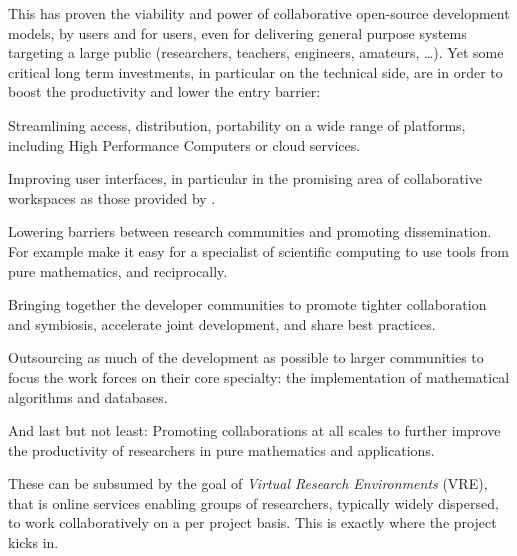 This has proven the viability and power of collaborative open-source development models,
by users and for users, even for delivering general purpose systems targeting a large
public (researchers, teachers, engineers, amateurs, \ldots). Yet some critical long term
investments, in particular on the technical side, are in order to boost the productivity
and lower the entry barrier:
\begin{compactitem}
\item Streamlining access, distribution, portability on a wide range of platforms, including
  High Performance Computers or cloud services.
\item Improving user interfaces, in particular in the promising area of collaborative
  workspaces as those provided by \SMC.
\item Lowering barriers between research communities and promoting dissemination. For example
  make it easy for a specialist of scientific computing to use tools from pure
  mathematics, and reciprocally.
\item Bringing together the developer communities to promote tighter collaboration and
  symbiosis, accelerate joint development, and share best practices.
\item Outsourcing as much of the development as possible to larger communities to focus
  the work forces on their core specialty: the implementation of mathematical algorithms
  and databases.
\item And last but not least: Promoting collaborations at all scales to further improve
  the productivity of researchers in pure mathematics and applications.
\end{compactitem}
These can be subsumed by the goal of \emph{Virtual Research Environments} (VRE), that is
online services enabling groups of researchers, typically widely dispersed, to work
collaboratively on a per project basis. This is exactly where the \ODK project kicks in. 

